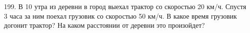199.  В 10 утра из деревни в город выехал трактор со скоростью 20 км/ч. Спустя 3 часа за ним поехал грузовик со скоростью 50 км/ч. В какое время грузовик догонит трактор? На каком расстоянии от деревни это произойдет?\\
